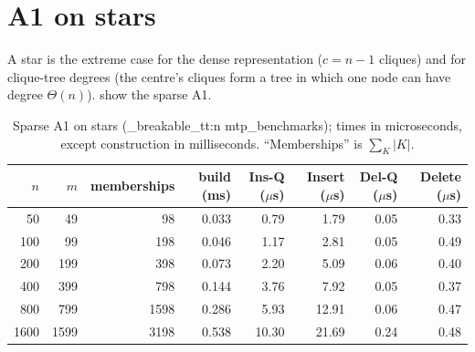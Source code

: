 \documentclass[11pt,a4paper,oneside]{report}
\theoremstyle{plain}
\theoremstyle{definition}
\theoremstyle{remark}
\newcommand{\op}[1]{\textsf{#1}}
\DeclareRobustCommand{\code}[1]{\mtp_breakable_tt:n {#1}}
\begin{document}
\section{A1 on stars}
A star is the extreme case for the dense representation (\(c=n-1\) cliques) and for clique-tree
degrees (the centre's cliques form a tree in which one node can have degree \(\Theta(n)\)).
 show the sparse A1.

\begin{table}[ht]
\centering\small
\caption[A1 on stars]{Sparse A1 on stars (\code{mtp_benchmarks}); times in microseconds, except
construction in milliseconds. ``Memberships'' is \(\sum_K|K|\).}\label{tab:a1-star}
\begin{tabular}{@{}rrrrrrrr@{}}
\toprule
\(n\) & \(m\) & memberships & build (ms) & \op{Ins-Q} (\(\mu\)s) & \op{Insert} (\(\mu\)s) & \op{Del-Q} (\(\mu\)s) & \op{Delete} (\(\mu\)s)\\
\midrule
50 & 49 & 98 & 0.033 & 0.79 & 1.79 & 0.05 & 0.33\\
100 & 99 & 198 & 0.046 & 1.17 & 2.81 & 0.05 & 0.49\\
200 & 199 & 398 & 0.073 & 2.20 & 5.09 & 0.06 & 0.40\\
400 & 399 & 798 & 0.144 & 3.76 & 7.92 & 0.05 & 0.37\\
800 & 799 & 1598 & 0.286 & 5.93 & 12.91 & 0.06 & 0.47\\
1600 & 1599 & 3198 & 0.538 & 10.30 & 21.69 & 0.24 & 0.48\\
\bottomrule
\end{tabular}
\end{table}
\end{document}
